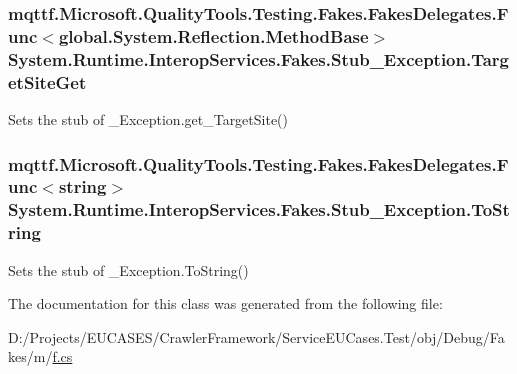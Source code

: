 \hypertarget{class_system_1_1_runtime_1_1_interop_services_1_1_fakes_1_1_stub___exception_aeb8e5192a32562c1e3f1bbf1cb7d8444}{
\subsubsection[{Target\-Site\-Get}]{\setlength{\rightskip}{0pt plus 5cm}mqttf.\-Microsoft.\-Quality\-Tools.\-Testing.\-Fakes.\-Fakes\-Delegates.\-Func$<$global.\-System.\-Reflection.\-Method\-Base$>$ System.\-Runtime.\-Interop\-Services.\-Fakes.\-Stub\-\_\-\-Exception.\-Target\-Site\-Get}}\label{class_system_1_1_runtime_1_1_interop_services_1_1_fakes_1_1_stub___exception_aeb8e5192a32562c1e3f1bbf1cb7d8444}


Sets the stub of \-\_\-\-Exception.\-get\-\_\-\-Target\-Site()

\hypertarget{class_system_1_1_runtime_1_1_interop_services_1_1_fakes_1_1_stub___exception_a8cc07d2b0de9554acad2800cfdb2bef3}{
\subsubsection[{To\-String}]{\setlength{\rightskip}{0pt plus 5cm}mqttf.\-Microsoft.\-Quality\-Tools.\-Testing.\-Fakes.\-Fakes\-Delegates.\-Func$<$string$>$ System.\-Runtime.\-Interop\-Services.\-Fakes.\-Stub\-\_\-\-Exception.\-To\-String}}\label{class_system_1_1_runtime_1_1_interop_services_1_1_fakes_1_1_stub___exception_a8cc07d2b0de9554acad2800cfdb2bef3}


Sets the stub of \-\_\-\-Exception.\-To\-String()



The documentation for this class was generated from the following file\-:\begin{DoxyCompactItemize}
\item 
D\-:/\-Projects/\-E\-U\-C\-A\-S\-E\-S/\-Crawler\-Framework/\-Service\-E\-U\-Cases.\-Test/obj/\-Debug/\-Fakes/m/\hyperlink{m_2f_8cs}{f.\-cs}\end{DoxyCompactItemize}
